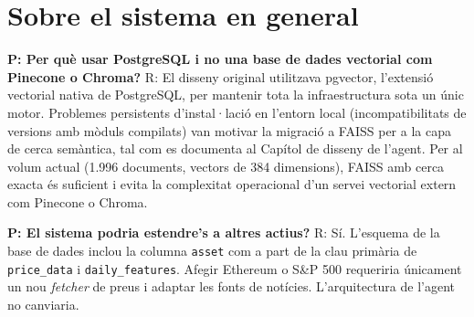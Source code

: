 \documentclass[12pt, a4paper]{report}
\begin{document}
\section*{Sobre el sistema en general}

\textbf{P: Per què usar PostgreSQL i no una base de dades vectorial com Pinecone o Chroma?}
R: El disseny original utilitzava pgvector, l'extensió vectorial nativa de PostgreSQL, per mantenir tota la infraestructura sota un únic motor. Problemes persistents d'instal·lació en l'entorn local (incompatibilitats de versions amb mòduls compilats) van motivar la migració a FAISS per a la capa de cerca semàntica, tal com es documenta al Capítol de disseny de l'agent. Per al volum actual (1.996 documents, vectors de 384 dimensions), FAISS amb cerca exacta és suficient i evita la complexitat operacional d'un servei vectorial extern com Pinecone o Chroma.

\textbf{P: El sistema podria estendre's a altres actius?}
R: Sí. L'esquema de la base de dades inclou la columna \texttt{asset} com a part de la clau primària de \texttt{price\_data} i \texttt{daily\_features}. Afegir Ethereum o S\&P 500 requeriria únicament un nou \textit{fetcher} de preus i adaptar les fonts de notícies. L'arquitectura de l'agent no canviaria.
\end{document}
